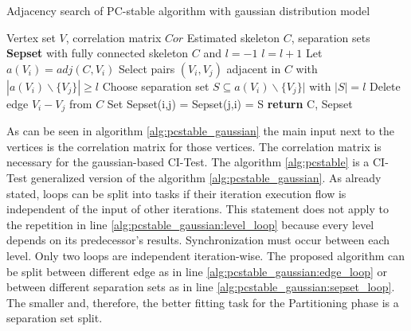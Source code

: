 \begin{algorithm}
    \caption{Adjacency search of PC-stable algorithm with gaussian distribution model \cite{schmidtOrderIndependentConstraintBasedCausal2018, colomboOrderIndependentConstraintBasedCausal}}
    \label{alg:pcstable_gaussian}
    \begin{algorithmic}[1]
    \Require Vertex set $V$, correlation matrix $Cor$
    \Ensure Estimated skeleton $C$, separation sets \textbf{Sepset}
    \State with fully connected skeleton $C$ and $l = -1$
    \Repeat \label{alg:pcstable_gaussian:level_loop}
        \State $l=l+1$
            \State Let $a(V_i) = adj(C,V_i)$
        \EndFor
        \Repeat \label{alg:pcstable_gaussian:edge_loop}
            \State Select pairs $(V_i,V_j)$ adjacent in $C$ with $|a(V_i)\backslash\{V_j\}| \geq l$
            \Repeat \label{alg:pcstable_gaussian:sepset_loop}
                \State Choose separation set $S \subseteq a(V_i ) \backslash \{V_j\}|$ with $| S | = l$
                    \State Delete edge $V_i - V_j$ from $C$
                    \State Set Sepset(i,j) = Sepset(j,i) = S
                \EndIf
    \State \textbf{return} C, Sepset
    \end{algorithmic}
\end{algorithm}

As can be seen in algorithm \ref{alg:pcstable_gaussian} the main input next to the vertices is the correlation matrix for those vertices. The correlation matrix is necessary for the gaussian-based CI-Test. The algorithm \ref{alg:pcstable} is a CI-Test generalized version of the algorithm \ref{alg:pcstable_gaussian}.
As already stated, loops can be split into tasks if their iteration execution flow is independent of the input of other iterations. This statement does not apply to the repetition in line \ref{alg:pcstable_gaussian:level_loop} because every level depends on its predecessor's results. Synchronization must occur between each level.
Only two loops are independent iteration-wise. The proposed algorithm can be split between different edge as in line \ref{alg:pcstable_gaussian:edge_loop} or between different separation sets as in line \ref{alg:pcstable_gaussian:sepset_loop}. The smaller and, therefore, the better fitting task for the Partitioning phase is a separation set split.

